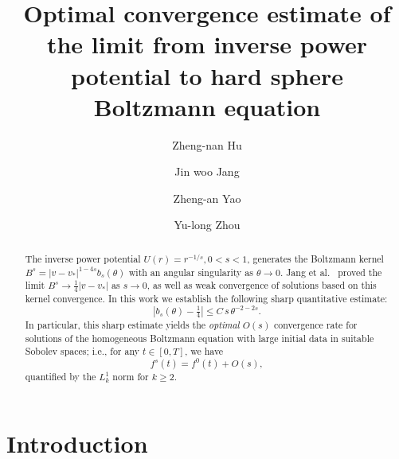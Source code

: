 \documentclass[reqno,10pt]{amsart}
\title[Optimal convergence estimates for Boltzmann equation]{Optimal convergence estimate of the limit from inverse power potential to hard sphere Boltzmann equation}
\author[Z.-N. Hu]{Zheng-nan Hu}
\author[J.-W. Jang]{Jin woo Jang}
\author[Z.-A. Yao]{Zheng-an Yao}
\author[Y.-L. Zhou]{Yu-long Zhou}
\theoremstyle{definition}
\numberwithin{equation}{section}
\begin{document}
 
	\begin{abstract} 

      The inverse power potential $U(r)=r^{-1/s}, 0<s<1$,  generates the Boltzmann kernel 
$B^{s}=|v-v_*|^{1-4s} b_s(\theta)$ with an angular singularity as $\theta\to 0$.  
Jang et al.~\cite{Jang2023-df} proved the limit $B^{s}\to \frac14|v-v_*|$ as $s\to 0$, as well as weak convergence of solutions based on this kernel convergence.  
In this work we establish the following sharp quantitative estimate:
\[
|b_s(\theta)-\tfrac14| \le C\, s\,\theta^{-2-2s}.
\]
In particular, this sharp estimate yields the \emph{optimal} $O(s)$ convergence rate for solutions of the homogeneous Boltzmann equation with large initial data in suitable Sobolev spaces; i.e., for any $t\in[0,T]$, we have 
$$f^s(t)=f^0(t)+O(s),$$ quantified by the $L^1_k$ norm for $k\ge 2.$

\end{abstract}


\maketitle
\section{Introduction}
\end{document}
